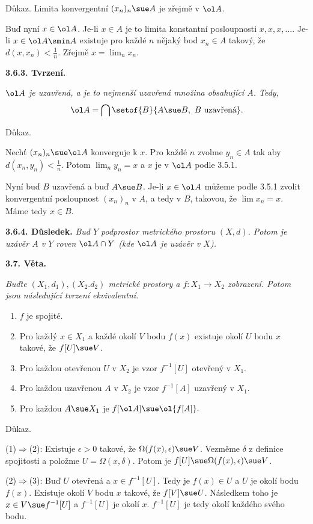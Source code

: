 \documentclass[12pt]{article}
\begin{document}
{{  Důkaz.} Limita konvergentní $(x_n)_n\sue A$ je zřejmě v $\ol A$.
  
  Buď nyní $x\in \ol A$. Je-li $x\in A$ je to limita konstantní posloupnosti $x,x,x,\dots$. Je-li $x\in\ol A\smin A$ existuje pro každé $n$ nějaký bod $x_n\in A$ takový, že $d(x,x_n)<\frac1n$. Zřejmě $x=\lim_nx_n$.\sq
  
  \medskip
  
  {\bf 3.6.3. Tvrzení.} {\em $\ol A$ je uzavřená, a je to nejmenší uzavřená množina obsahující  $A$. Tedy,
  $$
  \ol A=\bigcap\setof{B}{A\sue B,\ B\ \text{uzavřená}}.
  $$
  
  Důkaz.} Nechť $(x_n)_n\sue\ol A$ konverguje k $x$. Pro každé $n$ zvolme $y_n\in A$ tak aby $d(x_n,y_n)<\frac1n$. Potom $\lim_ny_n=x$ a $x$ je v $\ol A$ podle 3.5.1.
  
  Nyní buď $B$ uzavřená a buď $A\sue B$. Je-li $x\in \ol A$ můžeme podle 3.5.1 zvolit konvergentní posloupnost $(x_n)_n$ v $A$, a tedy v $B$, takovou, že $\lim x_n=x$. Máme tedy $x\in B$. \sq
  
  \medskip
  
  {\bf 3.6.4. Důsledek.} {\em Buď $Y$ podprostor metrického prostoru $(X,d)$. Potom je uzávěr $A$ v $Y$ roven $\ol A\cap Y$ (kde $\ol A$ je uzávěr v $X$).}
  
  
  \bigskip
  
  {\bf 3.7. Věta.} {\em Buďte $(X_1,d_1), (X_2.d_2)$ metrické prostory a $f:X_1\to X_2$ 
 zobrazení. Potom jsou následující tvrzení ekvivalentní.
  \begin{enumerate}
  \item $f$ je spojité.
  \item Pro každý $x\in X_1$ a každé okolí $V$ bodu $f(x)$ existuje okolí
  $U$ bodu $x$ takové, že $f[U]\sue V$.
  \item Pro každou otevřenou $U$ v $X_2$ je vzor $f^{-1}[U]$ otevřený v  $X_1$.
  \item Pro každou uzavřenou $A$ v $X_2$ je vzor $f^{-1}[A]$ uzavřený v $X_1$.
  \item Pro každou $A\sue X_1$ je  $f[\ol A]\sue \ol{f[A]}.$
  \end{enumerate}
  
  Důkaz.} (1)$\Rightarrow$(2): Existuje $\epsilon>0$ takové, že $\Omega(f(x),\epsilon)\sue V$. Vezměme $\delta$ z definice spojitosti a položme $U=\Omega(x,\delta)$. Potom je $f[U]\sue
  \Omega(f(x),\epsilon)\sue V$.
  
  (2)$\Rightarrow$(3): Buď $U$ otevřená  a $x\in f^{-1}[U]$. Tedy je $f(x)\in U$ a $U$ je okolí bodu $f(x)$. Existuje okolí $V$ bodu $x$ takové, že $f[V]\sue U$. Následkem toho je 
  $x\in V\sue f^{-1}[U]$ a $f^{-1}[U]$ je okolí $x$.
$f^{-1}[U]$ je tedy okolí každého svého bodu.
  
}
\end{document}
